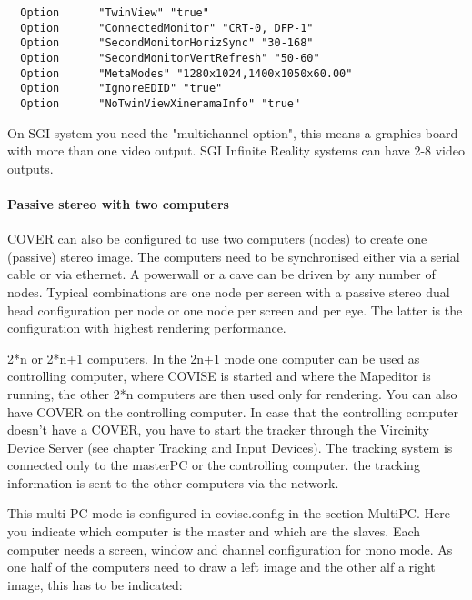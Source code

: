 \begin{samepage}
\small \begin{verbatim}
  Option      "TwinView" "true"
  Option      "ConnectedMonitor" "CRT-0, DFP-1"
  Option      "SecondMonitorHorizSync" "30-168"
  Option      "SecondMonitorVertRefresh" "50-60"
  Option      "MetaModes" "1280x1024,1400x1050x60.00"
  Option      "IgnoreEDID" "true"
  Option      "NoTwinViewXineramaInfo" "true"
\end{verbatim} \normalsize
\end{samepage}


On SGI system you need the "multichannel option", this means a graphics
board with more than one video output. SGI Infinite Reality systems
can have 2-8 video outputs.


\paragraph{Passive stereo with two computers}
COVER can also be configured to use two computers (nodes) to create one
(passive) stereo image. The computers need to be synchronised
either via a serial cable or via ethernet. 
A powerwall or a cave can be driven by any number of nodes. Typical combinations are one node per screen with a passive stereo dual head configuration per
node or one node per screen and per eye. The latter is the configuration with highest rendering performance.
 
2*n or 2*n+1 computers. In the 2n+1 mode one computer
can be used as controlling computer, where COVISE is started and
where the Mapeditor is running, the other 2*n computers are then used 
only for rendering. You can also have COVER on the controlling computer.
In case that the controlling computer doesn't have a COVER, you
have to start the tracker through the Vircinity Device Server (see chapter
Tracking and Input Devices). The tracking system is connected
only to the masterPC or the controlling computer. the tracking
information is sent to the other computers via the network.

This multi-PC mode is configured in covise.config in the section
MultiPC. Here you indicate which computer is the master and which are
the slaves. Each computer needs a screen, window and channel configuration
for mono mode. As one half of the computers need to draw a left image
and the other alf a right image, this has to be indicated:

